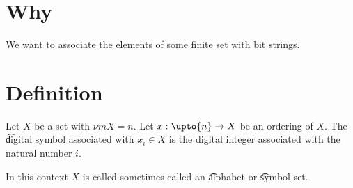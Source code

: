 

\section*{Why}

We want to associate the elements of some finite set with bit strings.

\section*{Definition}

Let $X$ be a set with $\nu m{X} = n$.
Let $x: \upto{n} \to X$ be an ordering of $X$.
The \t{digital symbol} associated with $x_i \in X$ is the digital integer associated with the natural number $i$.

In this context $X$ is called sometimes called an \t{alphabet} or \t{symbol set}.

\blankpage